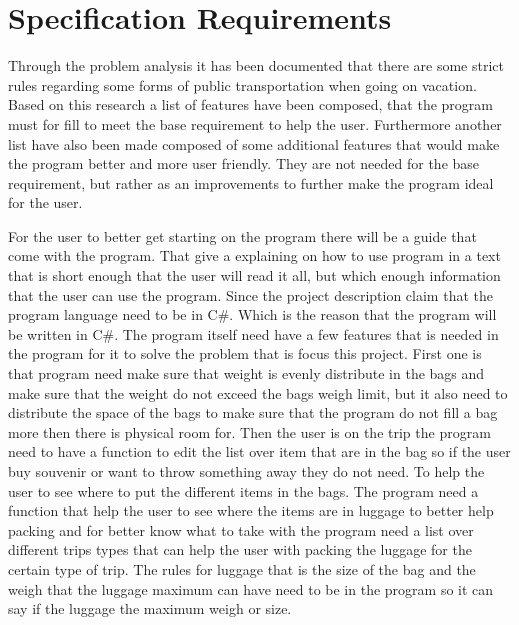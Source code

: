 \section{Specification Requirements}
\label{sec:Spec}
Through the problem analysis it has been documented that there are some strict rules regarding some forms of public transportation when going on vacation. Based on this research a list of features have been composed, that the program must for fill to meet the base requirement to help the user.
Furthermore another list have also been made composed of some additional features that would make the program better and more user friendly. They are not needed for the base requirement, but rather as an improvements to further make the program ideal for the user.

For the user to better get starting on the program there will be a guide that come with the program. That give a explaining on how to use program in a text that is short enough that the user will read it all, but which enough information that the user can use the program.
Since the project description claim that the program language need to be in C#. Which is the reason that the program will be written in C#.
The program itself need have a few features that is needed in the program for it to solve the problem that is focus this project. First one is that program need make sure that weight is evenly distribute in the bags and make sure that the weight do not exceed the bags weigh limit, but it also need to distribute the space of the bags to make sure that the program do not fill a bag more then there is physical room for.
Then the user is on the trip the program need to have a function to edit the list over item that are in the bag so if the user buy souvenir or want to throw something away they do not need.
To help the user to see where to put the different items in the bags. The program need a function that help the user to see where the items are in luggage to better help packing and for better know what to take with the program need a list over different trips types that can help the user with packing the luggage for the certain type of trip.
The rules for luggage that is the size of the bag and the weigh that the luggage maximum can have need to be in the program so it can say if the luggage the maximum weigh or size.


